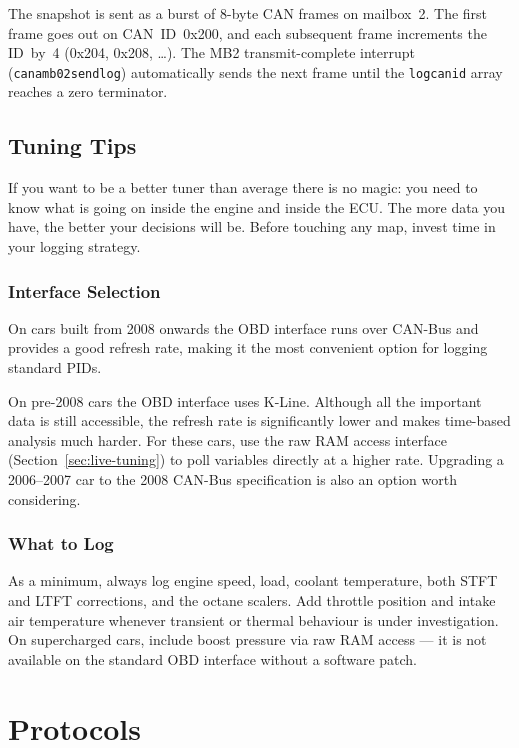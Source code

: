 \documentclass[a4paper,11pt]{article}
\renewcommand{\_}{\oldunderscore\allowbreak}
\begin{document}
The snapshot is sent as a burst of 8-byte CAN frames on mailbox~2. The first
frame goes out on CAN~ID~0x200, and each subsequent frame increments the
ID~by~4 (0x204, 0x208, \ldots). The MB2 transmit-complete interrupt
(\texttt{can\_a\_mb02\_send\_log}) automatically sends the next frame until the
\texttt{log\_canid} array reaches a zero terminator.

\subsection{Tuning Tips}

If you want to be a better tuner than average there is no magic: you need to
know what is going on inside the engine and inside the ECU. The more data you
have, the better your decisions will be. Before touching any map, invest time
in your logging strategy.

\subsubsection*{Interface Selection}

On cars built from 2008 onwards the OBD interface runs over CAN-Bus and
provides a good refresh rate, making it the most convenient option for
logging standard PIDs.

On pre-2008 cars the OBD interface uses K-Line. Although all the important
data is still accessible, the refresh rate is significantly lower and makes
time-based analysis much harder. For these cars, use the raw RAM access
interface (Section~\ref{sec:live-tuning}) to poll variables directly at a
higher rate. Upgrading a 2006--2007 car to the 2008 CAN-Bus specification is
also an option worth considering.

\subsubsection*{What to Log}

As a minimum, always log engine speed, load, coolant temperature, both STFT
and LTFT corrections, and the octane scalers. Add throttle position and
intake air temperature whenever transient or thermal behaviour is under
investigation. On supercharged cars, include boost pressure via raw RAM
access --- it is not available on the standard OBD interface without a
software patch.

\section{Protocols}
\end{document}
